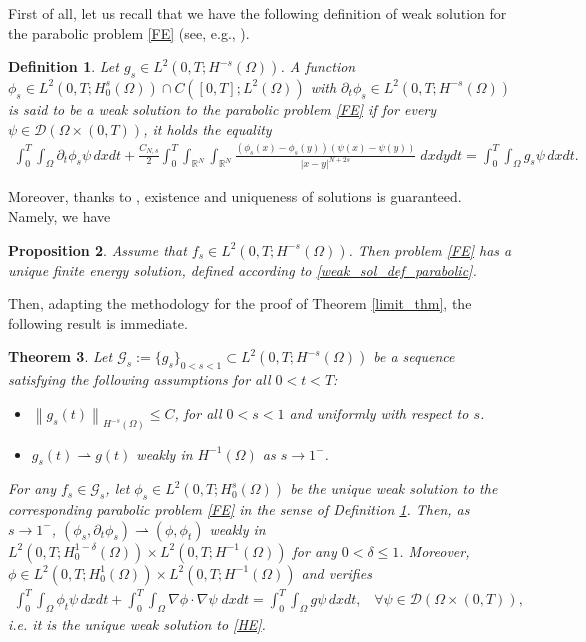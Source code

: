 \documentclass[reqno,twoside]{amsart}
\newtheorem{theorem}{Theorem}[section]
\newtheorem{definition}[theorem]{Definition}
\newtheorem{proposition}[theorem]{Proposition}
\numberwithin{equation}{section}
\def\RR{{\mathbb{R}}}
\newcommand{\norm}[2]{{\left\|#1\right\|}_{#2}}
\begin{document}
First of all, let us recall that we have the following definition of weak solution for the parabolic problem \eqref{FE} (see, e.g., \cite{leonori2015basic}).
\begin{definition}\label{weak_sol_def_parabolic}
Let $g_s\in L^2(0,T;H^{-s}(\Omega))$. A function $\phi_s\in L^2(0,T;H_0^s(\Omega))\cap C([0,T];L^2(\Omega))$ with $\partial_t\phi_s\in L^2(0,T;H^{-s}(\Omega))$ is said to be a weak solution to the parabolic problem \eqref{FE} if for every $\psi\in\mathcal{D}(\Omega\times(0,T))$, it holds the equality
\begin{align}\label{weak-sol-par}
	\int_0^T \int_\Omega\partial_t\phi_s\psi\,dxdt + \frac{C_{N,s}}{2}\int_0^T\int_{\RR^N}\int_{\RR^N}\frac{(\phi_s(x)-\phi_s(y))(\psi(x)-\psi(y))}{|x-y|^{N+2s}}\;dxdydt = \int_0^T\int_\Omega g_s\psi\,dxdt.
\end{align}
\end{definition}

Moreover, thanks to \cite[Theorem 26]{leonori2015basic}, existence and uniqueness of solutions is guaranteed. Namely, we have

\begin{proposition}
Assume that $f_s\in L^2(0,T;H^{-s}(\Omega))$. Then problem \eqref{FE} has a unique finite energy solution, defined according to \eqref{weak_sol_def_parabolic}.
\end{proposition}

Then, adapting the methodology for the proof of Theorem \eqref{limit_thm}, the following result is immediate.

\begin{theorem}\label{limit_thm_parabolic}
	Let $\mathcal{G}_s:=\{g_s\}_{0<s<1}\subset L^2(0,T;H^{-s}(\Omega))$ be a sequence satisfying the following assumptions for all $0<t<T$:
	\begin{itemize}
		\item[$\textbf{K1}$] $\norm{g_s(t)}{H^{-s}(\Omega)}\leq C$, for all $0<s<1$ and uniformly with respect to $s$.
		
		\item[$\textbf{K2}$] $g_s(t)\rightharpoonup g(t)$ weakly in $H^{-1}(\Omega)$ as $s\to 1^-$.
	\end{itemize}		
For any $f_s\in\mathcal{G}_s$, let $\phi_s\in L^2(0,T;H^s_0(\Omega))$ be the unique weak solution to the corresponding parabolic problem \eqref{FE} in the sense of Definition \ref{weak_sol_def_parabolic}. Then, as $s\to 1^-$, $(\phi_s,\partial_t\phi_s)\rightharpoonup (\phi,\phi_t)$ weakly in $L^2(0,T;H^{1-\delta}_0(\Omega))\times L^2(0,T;H^{-1}(\Omega))$ for any $0<\delta\leq 1$. Moreover, $\phi\in L^2(0,T;H^1_0(\Omega))\times L^2(0,T;H^{-1}(\Omega))$ and verifies
\begin{align*}
	\int_0^T \int_\Omega\phi_t\psi\,dxdt + \int_0^T\int_\Omega \nabla\phi\cdot\nabla\psi\;dxdt = \int_0^T\int_\Omega g\psi\,dxdt, \;\;\; \forall\psi\in\mathcal{D}(\Omega\times(0,T)),
\end{align*}
i.e. it is the unique weak solution to \eqref{HE}.
\end{theorem}
\end{document}
